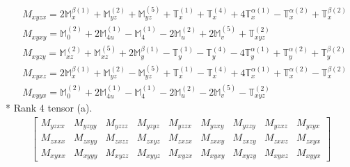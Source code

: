 \documentclass[fleqn,8pt,landscape]{jsarticle}
\begin{document}
\begin{align*}
& M_{xyzx} = 2 \mathbb{M}_{x}^{\beta(1)} + \mathbb{M}_{yz}^{(2)} + \mathbb{M}_{yz}^{(5)} + \mathbb{T}_{x}^{(1)} + \mathbb{T}_{x}^{(4)} + 4 \mathbb{T}_{x}^{\alpha(1)} - \mathbb{T}_{x}^{\alpha(2)} + \mathbb{T}_{x}^{\beta(2)} \\
& M_{xyxy} = \mathbb{M}_{0}^{(2)} + 2 \mathbb{M}_{4u}^{(1)} - \mathbb{M}_{4}^{(1)} - 2 \mathbb{M}_{u}^{(2)} + 2 \mathbb{M}_{v}^{(5)} + \mathbb{T}_{xyz}^{(2)} \\
& M_{xyzy} = \mathbb{M}_{xz}^{(2)} + \mathbb{M}_{xz}^{(5)} + 2 \mathbb{M}_{y}^{\beta(1)} - \mathbb{T}_{y}^{(1)} - \mathbb{T}_{y}^{(4)} - 4 \mathbb{T}_{y}^{\alpha(1)} + \mathbb{T}_{y}^{\alpha(2)} + \mathbb{T}_{y}^{\beta(2)} \\
& M_{xyxz} = 2 \mathbb{M}_{x}^{\beta(1)} + \mathbb{M}_{yz}^{(2)} - \mathbb{M}_{yz}^{(5)} + \mathbb{T}_{x}^{(1)} - \mathbb{T}_{x}^{(4)} + 4 \mathbb{T}_{x}^{\alpha(1)} + \mathbb{T}_{x}^{\alpha(2)} - \mathbb{T}_{x}^{\beta(2)} \\
& M_{xyyx} = \mathbb{M}_{0}^{(2)} + 2 \mathbb{M}_{4u}^{(1)} - \mathbb{M}_{4}^{(1)} - 2 \mathbb{M}_{u}^{(2)} - 2 \mathbb{M}_{v}^{(5)} - \mathbb{T}_{xyz}^{(2)}
\end{align*}
* Rank 4 tensor (a).
\begin{align*}
\begin{bmatrix} M_{yzxx} & M_{yzyy} & M_{yzzz} & M_{yzyz} & M_{yzzx} & M_{yzxy} & M_{yzzy} & M_{yzxz} & M_{yzyx} \\ M_{zxxx} & M_{zxyy} & M_{zxzz} & M_{zxyz} & M_{zxzx} & M_{zxxy} & M_{zxzy} & M_{zxxz} & M_{zxyx} \\ M_{xyxx} & M_{xyyy} & M_{xyzz} & M_{xyyz} & M_{xyzx} & M_{xyxy} & M_{xyzy} & M_{xyxz} & M_{xyyx} \end{bmatrix}
\end{align*}
\end{document}
